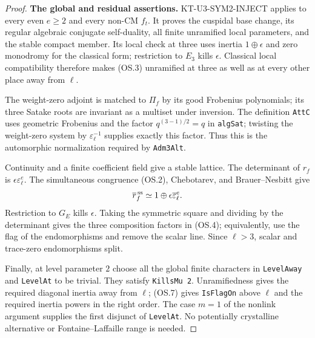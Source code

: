 \documentclass[11pt,a4paper]{article}
\theoremstyle{definition}
\renewcommand{\paragraph}[1]{\par\smallskip\noindent\textbf{#1}\quad\ignorespaces}
\begin{document}
\begin{proof}
\paragraph{The global and residual assertions.}
KT-U3-SYM2-INJECT applies to every even $e\geq2$ and every
non-CM $f_t$. It proves the cuspidal base change, its regular
algebraic conjugate self-duality, all finite unramified local
parameters, and the stable compact member. Its local check
at three uses inertia $1\oplus\epsilon$ and zero monodromy
for the classical form; restriction to $E_3$ kills
$\epsilon$. Classical local compatibility therefore makes
(OS.3) unramified at three as well as at every other place
away from $\ell$.

The weight-zero adjoint is matched to $\Pi_f$ by its good
Frobenius polynomials; its three Satake roots are invariant
as a multiset under inversion. The definition \texttt{AttC} uses
geometric Frobenius and the factor $q^{(3-1)/2}=q$ in
\texttt{algSat}; twisting the weight-zero system by
$\varepsilon_\ell^{-1}$ supplies exactly this factor.
Thus this is the automorphic normalization required by
\texttt{Adm3Alt}.

Continuity and a finite coefficient field give a stable
lattice. The determinant of $r_f$ is
$\epsilon\varepsilon_\ell^e$. The simultaneous congruence
(OS.2), Chebotarev, and Brauer--Nesbitt give
\[
       \overline r_f^{\,\rm ss}
              \simeq1\oplus\epsilon\overline\varepsilon_\ell^e.
\]
Restriction to $G_E$ kills $\epsilon$. Taking the symmetric
square and dividing by the determinant gives the three
composition factors in (OS.4); equivalently, use the flag
of the endomorphisms and remove the scalar line. Since
$\ell>3$, scalar and trace-zero endomorphisms split.

Finally, at level parameter $2$ choose all the global finite
characters in \texttt{LevelAway} and \texttt{LevelAt} to be
trivial. They satisfy \texttt{KillsMu 2}. Unramifiedness
gives the required diagonal inertia away from $\ell$;
(OS.7) gives \texttt{IsFlagOn} above $\ell$ and the required
inertia powers in the right order. The case $m=1$ of the
nonlink argument supplies the first disjunct of
\texttt{LevelAt}. No potentially crystalline alternative or
Fontaine--Laffaille range is needed.
\end{proof}
\end{document}
